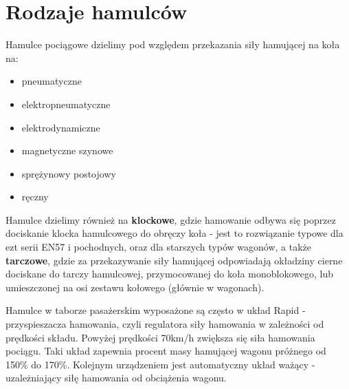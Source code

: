 \chapter{Rodzaje hamulców}

Hamulce pociągowe dzielimy pod względem przekazania siły hamującej na koła na:

\begin{itemize}
	\item pneumatyczne
	\item elektropneumatyczne
	\item elektrodynamiczne
	\item magnetyczne szynowe
	\item sprężynowy postojowy
	\item ręczny 
\end{itemize}
Hamulce dzielimy również na \textbf{klockowe}, gdzie hamowanie odbywa się poprzez dociskanie klocka hamulcowego do obręczy koła - jest to rozwiązanie typowe dla ezt serii EN57 i pochodnych, oraz dla starszych typów wagonów, a także \textbf{tarczowe}, gdzie za przekazywanie siły hamującej odpowiadają okładziny cierne dociskane do tarczy hamulcowej, przymocowanej do koła monoblokowego, lub umieszczonej na osi zestawu kołowego (głównie w wagonach).

Hamulce w taborze pasażerskim wyposażone są często w układ Rapid - przyspieszacza hamowania, czyli regulatora siły hamowania w zależności od prędkości składu. Powyżej prędkości 70km/h zwiększa się siła hamowania pociągu. Taki układ zapewnia procent masy hamującej wagonu próżnego od 150\% do 170\%. Kolejnym urządzeniem jest automatyczny układ ważący - uzależniający siłę hamowania od obciążenia wagonu.


